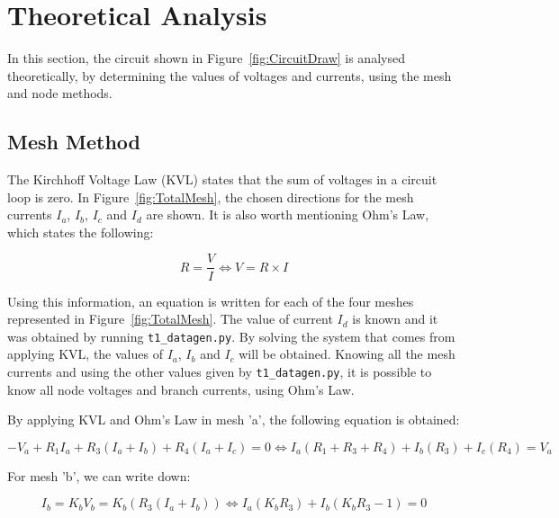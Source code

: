 \section{Theoretical Analysis}
\label{sec:analysis}

In this section, the circuit shown in Figure~\ref{fig:CircuitDraw} is analysed theoretically, by determining the values of voltages and currents, using the mesh and node methods.

\subsection{Mesh Method}

The Kirchhoff Voltage Law (KVL) states that the sum of voltages in a circuit loop is zero. In Figure~\ref{fig:TotalMesh}, the chosen directions for the mesh currents $I_a$, $I_b$, $I_c$ and $I_d$ are shown. It is also worth mentioning Ohm's Law, which states the following:
\par

\begin{equation}
  R=\frac{V}{I} \Leftrightarrow V=R \times I
  \label{eq:OhmLaw}
\end{equation}

Using this information, an equation is written for each of the four meshes represented in Figure~\ref{fig:TotalMesh}. The value of current $I_d$ is known and it was obtained by running \texttt{t1\_datagen.py}. By solving the system that comes from applying KVL, the values of $I_a$, $I_b$ and $I_c$ will be obtained. Knowing all the mesh currents and using the other values given by \texttt{t1\_datagen.py}, it is possible to know all node voltages and branch currents, using Ohm's Law.

\par
\vspace{1mm}

By applying KVL and Ohm's Law in mesh 'a', the following equation is obtained:

\begin{equation}
  -V_a+R_1I_a+R_3(I_a+I_b)+R_4(I_a+I_c)=0 \Leftrightarrow I_a(R_1+R_3+R_4)+I_b(R_3)+I_c(R_4)=V_a
  \label{eq:Mesh_a}
\end{equation}

For mesh 'b', we can write down:

\begin{equation}
  I_b=K_bV_b=K_b(R_3(I_a+I_b)) \Leftrightarrow I_a(K_bR_3)+I_b(K_bR_3-1)=0
  \label{eq:Mesh_b}
\end{equation}

